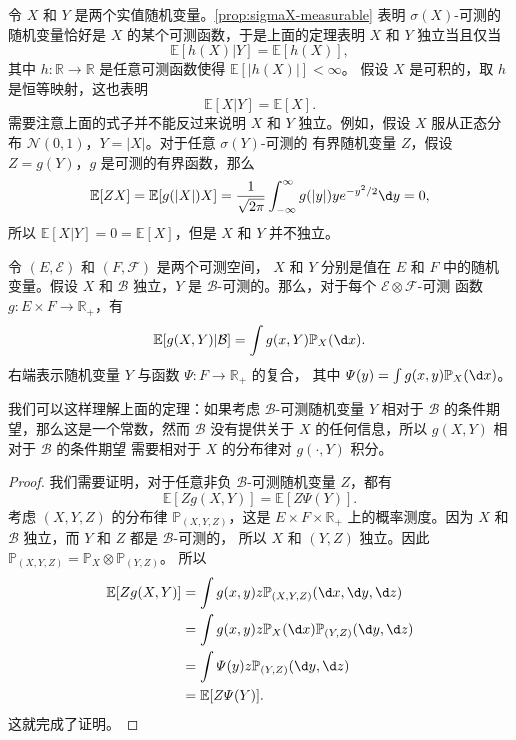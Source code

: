 令 $X$ 和 $Y$ 是两个实值随机变量。\autoref{prop:sigmaX-measurable} 表明
$\sigma(X)$-可测的随机变量恰好是 $X$ 的某个可测函数，于是上面的定理表明
$X$ 和 $Y$ 独立当且仅当
\[
  \mathbb{E}[h(X)|Y]=\mathbb{E}[h(X)],
\]
其中 $h:\mathbb{R}\to \mathbb{R}$ 是任意可测函数使得 $\mathbb{E}[|h(X)|]<\infty$。
假设 $X$ 是可积的，取 $h$ 是恒等映射，这也表明
\[
  \mathbb{E}[X|Y]=\mathbb{E}[X].
\]
需要注意上面的式子并不能反过来说明 $X$ 和 $Y$ 独立。例如，假设 $X$
服从正态分布 $\mathcal{N}(0,1)$，$Y=|X|$。对于任意 $\sigma(Y)$-可测的
有界随机变量 $Z$，假设 $Z=g(Y)$，$g$ 是可测的有界函数，那么
\[
  \mathbb{E}[ZX]=\mathbb{E}[g(|X|)X]=\frac{1}{\sqrt{2\pi}}
  \int_{-\infty}^\infty g(|y|)ye^{-y^2/2}\d y=0,
\]
所以 $\mathbb{E}[X|Y]=0=\mathbb{E}[X]$，但是 $X$ 和 $Y$ 并不独立。

\begin{theorem}
  令 $(E,\mathcal{E})$ 和 $(F,\mathcal{F})$ 是两个可测空间，
  $X$ 和 $Y$ 分别是值在 $E$ 和 $F$ 中的随机变量。假设 $X$ 和 $\mathcal{B}$
  独立，$Y$ 是 $\mathcal{B}$-可测的。那么，对于每个 $\mathcal{E}\otimes \mathcal{F}$-可测
  函数 $g:E\times F\to \mathbb{R}_+$，有
  \[
    \mathbb{E}[g(X,Y)|\mathcal{B}]=\int g(x,Y) \mathbb{P}_X(\d x).
  \]
  右端表示随机变量 $Y$ 与函数 $\varPsi:F\to \mathbb{R}_+$ 的复合，
  其中 $\varPsi(y)=\int g(x,y) \mathbb{P}_X(\d x)$。
\end{theorem}
\begin{remark}
  我们可以这样理解上面的定理：如果考虑 $\mathcal{B}$-可测随机变量 $Y$
  相对于 $\mathcal{B}$ 的条件期望，那么这是一个常数，然而 $\mathcal{B}$
  没有提供关于 $X$ 的任何信息，所以 $g(X,Y)$ 相对于 $\mathcal{B}$ 的条件期望
  需要相对于 $X$ 的分布律对 $g(\cdot ,Y)$ 积分。
\end{remark}
\begin{proof}
  我们需要证明，对于任意非负 $\mathcal{B}$-可测随机变量 $Z$，都有
  \[
    \mathbb{E}[Zg(X,Y)]=\mathbb{E}[Z\varPsi(Y)].
  \]
  考虑 $(X,Y,Z)$ 的分布律 $\mathbb{P}_{(X,Y,Z)}$，这是 $E\times F\times \mathbb{R}_+$
  上的概率测度。因为 $X$ 和 $\mathcal{B}$ 独立，而 $Y$ 和 $Z$ 都是 $\mathcal{B}$-可测的，
  所以 $X$ 和 $(Y,Z)$ 独立。因此 $\mathbb{P}_{(X,Y,Z)}=\mathbb{P}_X\otimes \mathbb{P}_{(Y,Z)}$。
  所以
  \begin{align*}
    \mathbb{E}[Zg(X,Y)]&=\int g(x,y)z \mathbb{P}_{(X,Y,Z)}(\d x,\d y,\d z)\\
    &=\int g(x,y)z \mathbb{P}_X(\d x)\mathbb{P}_{(Y,Z)}(\d y,\d z)\\
    &=\int \varPsi(y)z \mathbb{P}_{(Y,Z)}(\d y,\d z)\\
    &=\mathbb{E}[Z\varPsi(Y)].
  \end{align*}
  这就完成了证明。
\end{proof}






